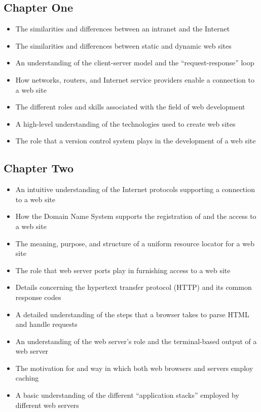 \documentclass[11pt]{article}
\begin{document}
\vspace*{-.15in}

\subsection*{Chapter One}

\begin{itemize}

  \itemsep 0in

  \item The similarities and differences between an intranet and the Internet
  \item The similarities and differences between static and dynamic web sites
  \item An understanding of the client-server model and the ``request-response''
    loop
  \item How networks, routers, and Internet service providers enable a
    connection to a web site
  \item The different roles and skills associated with the field of web development
  \item A high-level understanding of the technologies used to create web sites
  \item The role that a version control system plays in the development of a web
    site

\end{itemize}

\vspace*{-.2in}
\subsection*{Chapter Two}

\begin{itemize}

  \itemsep 0in

  \item An intuitive understanding of the Internet protocols supporting a
    connection to a web site
  \item How the Domain Name System supports the registration of and the access
    to a web site
  \item The meaning, purpose, and structure of a uniform resource locator for a
    web site
  \item The role that web server ports play in furnishing access to a web site
  \item Details concerning the hypertext transfer protocol (HTTP) and its
    common response codes
  \item A detailed understanding of the steps that a browser takes to parse HTML
    and handle requests
  \item An understanding of the web server's role and the terminal-based output
    of a web server
  \item The motivation for and way in which both web browsers and servers employ
    caching
  \item A basic understanding of the different ``application stacks'' employed
    by different web servers

\end{itemize}
\end{document}
